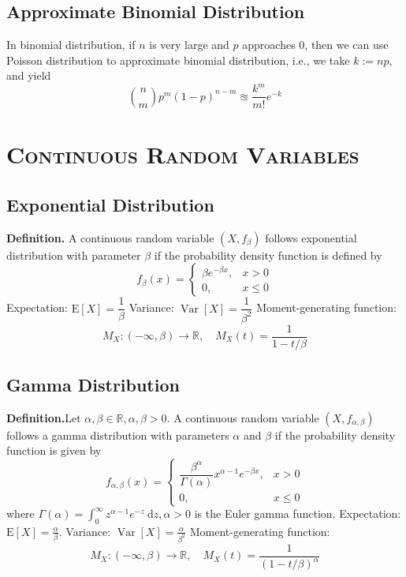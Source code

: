 \documentclass[a4paper,12pt]{article}
\begin{document}
\subsection{Approximate Binomial Distribution}
In binomial distribution, if $n$ is very large and $p$ approaches 0, then we can use Poisson distribution to approximate binomial distribution, i.e., we take $k:=np$, and yield
\begin{equation}
    \binom{n}{m} p^m(1-p)^{n-m} \approxeq \dfrac{k^m}{m !} e^{-k}
    \end{equation}



    \section{\textsc{Continuous Random Variables}}
    \subsection{Exponential Distribution}
    \textbf{Definition.}
A continuous random variable $\left(X, f_\beta\right)$ follows exponential distribution with parameter $\beta$ if the probability density function is defined by
\begin{equation}
f_\beta(x)= \begin{cases}\beta e^{-\beta x}, & x>0 \\ 0, & x \leq 0\end{cases}
\end{equation}
Expectation: $\mathrm{E}[X]=\dfrac{1}{\beta}$
Variance: $\operatorname{Var}[X]=\dfrac{1}{\beta^2}$
Moment-generating function:
 $$
 M_X:(-\infty, \beta) \rightarrow \mathbb{R}, \quad M_X(t)=\frac{1}{1-t / \beta}
 $$
    \subsection{Gamma Distribution}
    \textbf{Definition.}Let $\alpha, \beta \in \mathbb{R}, \alpha, \beta>0$. A continuous random variable $\left(X, f_{\alpha, \beta}\right)$ follows a gamma distribution with parameters $\alpha$ and $\beta$ if the probability density function is given by
\begin{equation}
f_{\alpha, \beta}(x)= \begin{cases}\dfrac{\beta^\alpha}{\Gamma(\alpha)} x^{\alpha-1} e^{-\beta x}, & x>0 \\ 0, & x \leq 0\end{cases}
\end{equation}
where $\Gamma(\alpha)=\int_0^{\infty} z^{\alpha-1} e^{-z} \mathrm{~d} z, \alpha>0$ is the Euler gamma function.
Expectation: $\mathrm{E}[X]=\frac{\alpha}{\beta}$. Variance: $\operatorname{Var}[X]=\frac{\alpha}{\beta^2}$
Moment-generating function:
$$
M_X:(-\infty, \beta) \rightarrow \mathbb{R}, \quad M_X(t)=\frac{1}{(1-t / \beta)^\alpha}
$$
\end{document}
